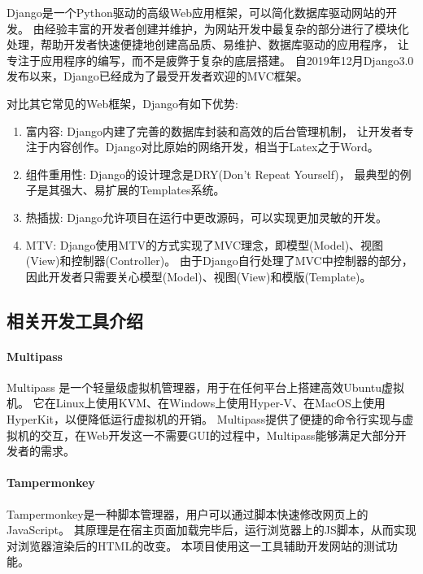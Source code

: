 \documentclass{morningstar}
\begin{document}

Django是一个Python驱动的高级Web应用框架，可以简化数据库驱动网站的开发。
由经验丰富的开发者创建并维护，为网站开发中最复杂的部分进行了模块化处理，帮助开发者快速便捷地创建高品质、易维护、数据库驱动的应用程序，
让专注于应用程序的编写，而不是疲弊于复杂的底层搭建。\cite{django2}
自2019年12月Django3.0发布以来，Django已经成为了最受开发者欢迎的MVC框架。

对比其它常见的Web框架，Django有如下优势: 
\begin{enumerate}
    \item 富内容: Django内建了完善的数据库封装和高效的后台管理机制，
    让开发者专注于内容创作。Django对比原始的网络开发，相当于Latex之于Word。
    \item 组件重用性: Django的设计理念是DRY(Don't Repeat Yourself)，
    最典型的例子是其强大、易扩展的Templates系统。\cite{django1}
    \item 热插拔: Django允许项目在运行中更改源码，可以实现更加灵敏的开发。
    \item MTV: Django使用MTV的方式实现了MVC理念，即模型(Model)、视图(View)和控制器(Controller)。
    由于Django自行处理了MVC中控制器的部分，因此开发者只需要关心模型(Model)、视图(View)和模版(Template)。
\end{enumerate}

\clearpage
\subsection{相关开发工具介绍}

\paragraph{Multipass}

Multipass 是一个轻量级虚拟机管理器，用于在任何平台上搭建高效Ubuntu虚拟机。
它在Linux上使用KVM、在Windows上使用Hyper-V、在MacOS上使用HyperKit，以便降低运行虚拟机的开销。
Multipass提供了便捷的命令行实现与虚拟机的交互，在Web开发这一不需要GUI的过程中，Multipass能够满足大部分开发者的需求。


\paragraph{Tampermonkey}

Tampermonkey是一种脚本管理器，用户可以通过脚本快速修改网页上的JavaScript。
其原理是在宿主页面加载完毕后，运行浏览器上的JS脚本，从而实现对浏览器渲染后的HTML的改变。
本项目使用这一工具辅助开发网站的测试功能。
\end{document}

